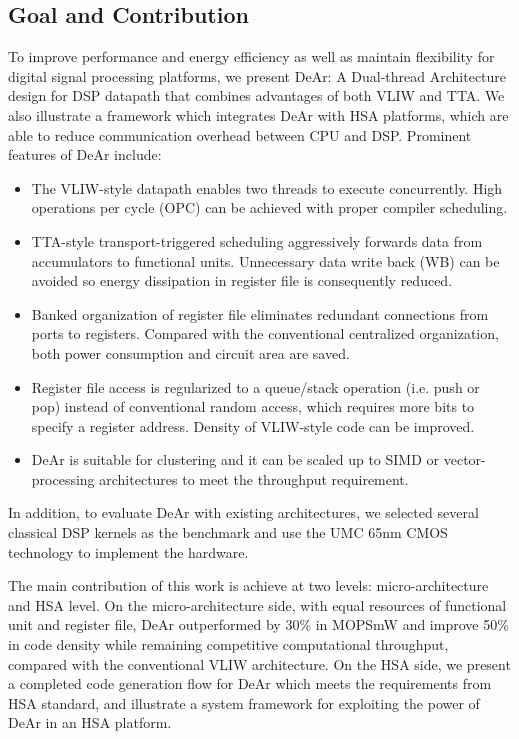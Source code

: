 \documentclass[12pt]{article}
\begin{document}
\begin{CJK}{UTF8}{bkai}
    \subsection{Goal and Contribution}
        To improve performance and energy efficiency as well as maintain flexibility for digital signal processing platforms, 
        we present DeAr: A Dual-thread Architecture design for DSP datapath that combines advantages of both VLIW and TTA.
        We also illustrate a framework which integrates DeAr with HSA platforms, which are able to reduce communication overhead between CPU and DSP. 
        Prominent features of DeAr include:
        \begin{itemize}
            \item The VLIW-style datapath enables two threads to execute concurrently. High operations per cycle (OPC) can be achieved with proper compiler scheduling.
            \item TTA-style transport-triggered scheduling aggressively forwards data from accumulators to functional units. Unnecessary data write back (WB) can be avoided so energy dissipation in register file is consequently reduced.
            \item Banked organization of register file eliminates redundant connections from ports to registers. Compared with the conventional centralized organization, both power consumption and circuit area are saved.
            \item Register file access is regularized to a queue/stack operation (i.e. push or pop) instead of conventional random access, which requires more bits to specify a register address. Density of VLIW-style code can be improved.
            \item DeAr is suitable for clustering and it can be scaled up to SIMD or vector-processing architectures to meet the throughput requirement.
        \end{itemize}
        In addition, to evaluate DeAr with existing architectures, we selected several classical DSP kernels \cite{dspstone} \cite{bdti} as the benchmark and use the UMC 65nm CMOS technology to implement the hardware.

        The main contribution of this work is achieve at two levels: micro-architecture and HSA level. 
        On the micro-architecture side, with equal resources of functional unit and register file, DeAr outperformed by 30\% in MOPS\/mW and improve 50\% in code density while remaining competitive computational throughput, compared with the conventional VLIW architecture.
        On the HSA side, we present a completed code generation flow for DeAr which meets the requirements from HSA standard, and illustrate a system framework for exploiting the power of DeAr in an HSA platform.
 

\end{CJK}
\end{document}
